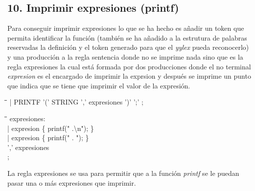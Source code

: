 \documentclass[11pt,spanish]{article}
\begin{document}
		\subsection*{10. Imprimir expresiones (printf)}
		\label{subsec:10}
		Para conseguir imprimir expresiones lo que se ha hecho es añadir un token que permita identificar la función (también se ha añadido a la estrutura de palabras reservadas la definición y el token generado para que el \textit {yylex} pueda reconocerlo) y una producción a la regla {\ttfamily sentencia} donde no se imprime nada sino que es la regla {\ttfamily expresiones} la cual está formada por dos producciones donde el no terminal \textit {expresion} es el encargado de imprimir la exprsion y después se imprime un punto que indica que se tiene que imprimir el valor de la expresión.
		\begin{tabbing}
			\hspace*{1cm}\=\hspace*{1cm}\= \hspace*{4cm}\=\kill
			\> | PRINTF '(' STRING ',' expresiones ')' ';'
			;
		\end{tabbing}
		\begin{tabbing}
			\hspace*{1cm}\=\hspace*{1cm}\= \hspace*{6cm}\=\kill
			expresiones:\\
					\>| expresion\> \> \{ printf(" .\textbackslash n"); \}\\
					\>| expresion\> \> \{ printf(" . "); \}\\
					\>\>',' expresiones\\
			;
		\end{tabbing}
		La regla {\ttfamily expresiones} se usa para permitir que a la función \textit {printf} se le puedan pasar una o más expresiones que imprimir.
\end{document}

